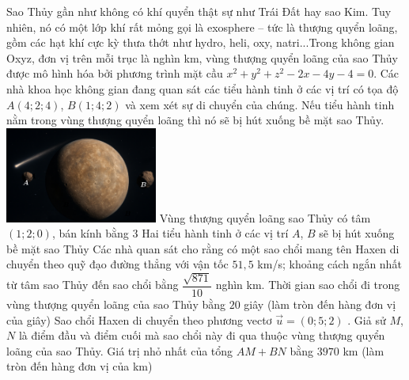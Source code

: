 \begin{ex}%
\immini
{
    Sao Thủy gần như không có khí quyển thật sự như Trái Đất hay sao Kim. Tuy nhiên, nó có một lớp khí rất mỏng gọi là exosphere – tức là thượng quyển loãng, gồm các hạt khí cực kỳ thưa thớt như hydro, heli, oxy, natri...Trong không gian Oxyz, đơn vị trên mỗi trục là nghìn km, vùng thượng quyển loãng của sao Thủy được mô hình hóa bởi phương trình mặt cầu $x^2+y^2+z^2-2x-4y-4=0$. Các nhà khoa học không gian đang quan sát các tiểu hành tinh ở các vị trí có tọa độ $A\left(4;2;4\right)$, $B\left(1;4;2\right)$ và xem xét sự di chuyển của chúng. Nếu tiểu hành tinh nằm trong vùng thượng quyển loãng thì nó sẽ bị hút xuống bề mặt sao Thủy.
}
{
    \includegraphics[width=5cm]{img/HXN-2-15}
}
\choiceTF
    {\True Vùng thượng quyển loãng sao Thủy có tâm $\left(1;2;0\right)$, bán kính bằng $3$}
    {Hai tiểu hành tinh ở các vị trí $A$, $B$ sẽ bị hút xuống bề mặt sao Thủy}
    {Các nhà quan sát cho rằng có một sao chổi mang tên Haxen di chuyển theo quỹ đạo đường thẳng với vận tốc $51{,}5$ km/s; khoảng cách ngắn nhất từ tâm sao Thủy đến sao chổi bằng $\dfrac{\sqrt{871}}{10}$ nghìn km. Thời gian sao chổi đi trong vùng thượng quyển loãng của sao Thủy bằng $20$ giây (làm tròn đến hàng đơn vị của giây)}
    {\True Sao chổi Haxen di chuyển theo phương vectơ $\vec{u}=\left(0;5;2\right)$ . Giả sử $M$, $N$ là điểm đầu và điểm cuối mà sao chổi này đi qua thuộc vùng thượng quyển loãng của sao Thủy. Giá trị nhỏ nhất của tổng $AM+BN$ bằng $3970$ km (làm tròn đến hàng đơn vị của km)}
\end{ex}
